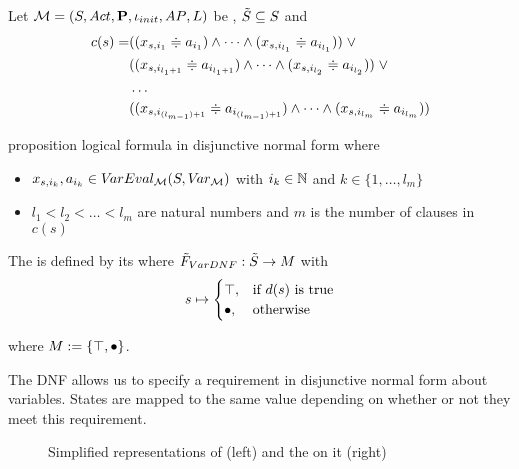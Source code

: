 \documentclass[preview]{standalone}
\begin{document}
\begin{definition}
	Let $\chgph = \chgphtuple$ be \achgphN, $\smstates \subseteq \states$ and 
	\begin{align*}
		c(s) = &((\varstate[,i_1] \eqorneq \varval_{i_1}) \land \dots \land (\varstate[,i_{l_1}] \eqorneq \varval_{i_{l_1}})) \; \lor \\
		&((\varstate[,i_{l_1+1}] \eqorneq \varval_{i_{l_1+1}}) \land \dots \land (\varstate[,i_{l_2}] \eqorneq \varval_{i_{l_2}})) \; \lor  \\
		&\dots \\ 
		&((\varstate[,i_{(l_{m-1})+1}] \eqorneq \varval_{i_{(l_{m-1})+1}}) \land \dots \land (\varstate[,i_{l_m}]  \eqorneq \varval_{i_{l_m}}))
	\end{align*}
	
	proposition logical formula in disjunctive normal form where
	\begin{itemize}
		\item $\varstate[,i_k], a_{i_k} \in \varevalimg$ with $i_k\in \natnums$ and $k \in \{1, \dots, l_m\}$
		\item $l_1 < l_2 < \dots < l_m$ are natural numbers and $m$ is the number of clauses in $c(s)$
	\end{itemize}		
	The \viewN \viewparamdnf is defined by its \grpfctN where $\gfctsubparamdnf : \smstates \to \imggrp$ with
	\[
	\state \mapsto
	\begin{cases}
			\group, &\text{if } d(s) \text{ is true}\\
			\remelem, 	&\text{otherwise}
		\end{cases}
	\]
	
	where $\imggrp := \{\group, \remelem\}$.
\end{definition}


The DNF allows us to specify a requirement in disjunctive normal form about variables. States are mapped to the same value depending on whether or not they meet this requirement.


\begin{figure}[h]
	\begin{minipage}{.6\textwidth}
		
	\end{minipage}%
	\begin{minipage}{.5\textwidth}
		
	\end{minipage}
	\caption{Simplified representations of \mdp (left) and the \viewN \viewparamdnf on it (right)}
	\label{fig:varsDnf}  
\end{figure}
\end{document}
